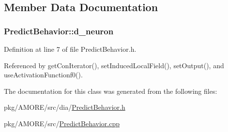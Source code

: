 \subsection{Member Data Documentation}
\hypertarget{class_predict_behavior_a49a9daba3c9e798fc7815ac44b645dc0}{
\subsubsection[{d\_\-neuron}]{ {\bf PredictBehavior::d\_\-neuron}}}
\label{class_predict_behavior_a49a9daba3c9e798fc7815ac44b645dc0}


Definition at line 7 of file PredictBehavior.h.



Referenced by getConIterator(), setInducedLocalField(), setOutput(), and useActivationFunctionf0().



The documentation for this class was generated from the following files:\begin{DoxyCompactItemize}
\item 
pkg/AMORE/src/dia/\hyperlink{_predict_behavior_8h}{PredictBehavior.h}\item 
pkg/AMORE/src/\hyperlink{_predict_behavior_8cpp}{PredictBehavior.cpp}\end{DoxyCompactItemize}
